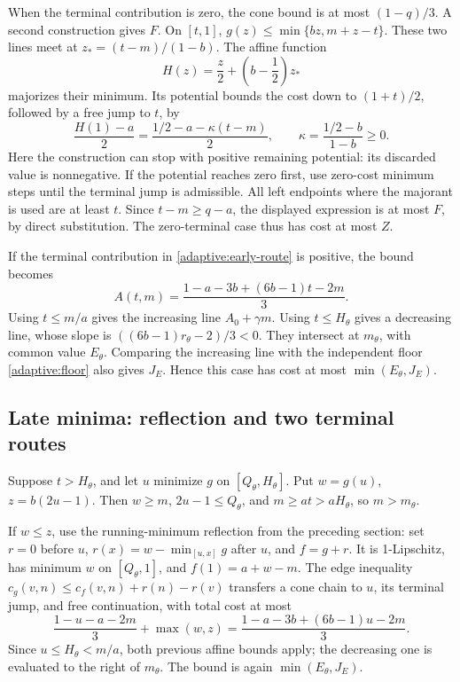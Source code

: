 When the terminal contribution is zero, the cone bound is at most
\((1-q)/3\). A second construction gives \(F\). On \([t,1]\),
\(g(z)\le\min\{bz,m+z-t\}\). These two lines meet at
\(z_*=(t-m)/(1-b)\). The affine function
\[
 H(z)=\frac z2+\left(b-\frac12\right)z_*
\]
majorizes their minimum. Its potential bounds the cost down to
\((1+t)/2\), followed by a free jump to \(t\), by
\[
 \frac{H(1)-a}{2}
 =\frac{1/2-a-\kappa(t-m)}2,
 \qquad\kappa=\frac{1/2-b}{1-b}\ge0.
\]
Here the construction can stop with positive remaining potential: its
discarded value is nonnegative. If the potential reaches zero first,
use zero-cost minimum steps until the terminal jump is admissible. All
left endpoints where the majorant is used are at least \(t\).
Since \(t-m\ge q-a\), the displayed expression is at most \(F\), by
direct substitution. The zero-terminal case thus has cost at most \(Z\).

If the terminal contribution in \eqref{adaptive:early-route} is positive,
the bound becomes
\[
 A(t,m)=\frac{1-a-3b+(6b-1)t-2m}{3}.
\]
Using \(t\le m/a\) gives the increasing line \(A_0+\gamma m\).
Using \(t\le H_\theta\) gives a decreasing line, whose slope is
\(((6b-1)r_\theta-2)/3<0\). They intersect at \(m_\theta\),
with common value \(E_\theta\). Comparing the increasing line with
the independent floor \eqref{adaptive:floor} also gives \(J_E\).
Hence this case has cost at most \(\min(E_\theta,J_E)\).

\subsection{Late minima: reflection and two terminal routes}
Suppose \(t>H_\theta\), and let \(u\) minimize \(g\) on
\([Q_\theta,H_\theta]\). Put \(w=g(u)\), \(z=b(2u-1)\).
Then \(w\ge m\), \(2u-1\le Q_\theta\), and
\(m\ge at>aH_\theta\), so \(m>m_\theta\).

If \(w\le z\), use the running-minimum reflection from the preceding
section: set \(r=0\) before \(u\),
\(r(x)=w-\min_{[u,x]}g\) after \(u\), and \(f=g+r\).
It is 1-Lipschitz, has minimum \(w\) on \([Q_\theta,1]\), and
\(f(1)=a+w-m\). The edge inequality
\(c_g(v,n)\le c_f(v,n)+r(n)-r(v)\) transfers a cone chain to \(u\),
its terminal jump, and free continuation, with total cost at most
\[
 \frac{1-u-a-2m}{3}+\max(w,z)
 =\frac{1-a-3b+(6b-1)u-2m}{3}.
\]
Since \(u\le H_\theta<m/a\), both previous affine bounds apply;
the decreasing one is evaluated to the right of \(m_\theta\).
The bound is again \(\min(E_\theta,J_E)\).

